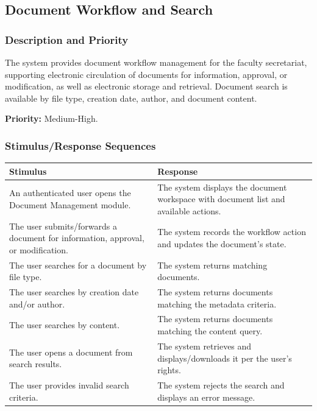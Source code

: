 \documentclass[11pt, a4paper]{article}
\begin{document}
\subsection{Document Workflow and Search}

\subsubsection{Description and Priority}
The system provides document workflow management for the faculty secretariat, supporting electronic circulation of documents for information, approval, or modification, as well as electronic storage and retrieval. Document search is available by file type, creation date, author, and document content.

\textbf{Priority:} Medium-High.

\subsubsection{Stimulus/Response Sequences}
\begin{table}[H]
\begin{tabularx}{\textwidth}{>{\raggedright\arraybackslash}p{3.2cm} >{\raggedright\arraybackslash}X}
\toprule
\textbf{Stimulus} & \textbf{Response} \\
\midrule
An authenticated user opens the Document Management module. & The system displays the document workspace with document list and available actions. \\
\midrule
The user submits/forwards a document for information, approval, or modification. & The system records the workflow action and updates the document's state. \\
\midrule
The user searches for a document by file type. & The system returns matching documents. \\
\midrule
The user searches by creation date and/or author. & The system returns documents matching the metadata criteria. \\
\midrule
The user searches by content. & The system returns documents matching the content query. \\
\midrule
The user opens a document from search results. & The system retrieves and displays/downloads it per the user's rights. \\
\midrule
The user provides invalid search criteria. & The system rejects the search and displays an error message. \\
\bottomrule
\end{tabularx}
\end{table}
\end{document}
